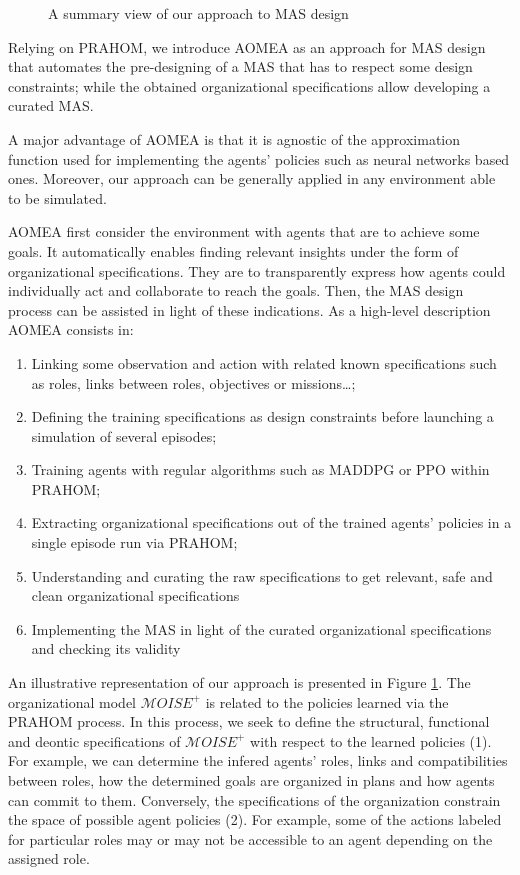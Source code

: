 \documentclass[runningheads]{llncs}
\begin{document}
\begin{figure}[h!]
    \centering
    
    \caption{A summary view of our approach to MAS design}
    \label{fig:design_approach}
\end{figure}

Relying on PRAHOM, we introduce AOMEA as an approach for MAS design that automates the pre-designing of a MAS that has to respect some design constraints; while the obtained organizational specifications allow developing a curated MAS.

A major advantage of AOMEA is that it is agnostic of the approximation function used for implementing the agents' policies such as neural networks based ones. Moreover, our approach can be generally applied in any environment able to be simulated.

AOMEA first consider the environment with agents that are to achieve some goals. It automatically enables finding relevant insights under the form of organizational specifications. They are to transparently express how agents could individually act and collaborate to reach the goals. Then, the MAS design process can be assisted in light of these indications. As a high-level description AOMEA consists in:
\begin{enumerate}
    \item Linking some observation and action with related known specifications such as roles, links between roles, objectives or missions\dots;
    \item Defining the training specifications as design constraints before launching a simulation of several episodes;
    \item Training agents with regular algorithms such as MADDPG or PPO within PRAHOM;
    \item Extracting organizational specifications out of the  trained agents' policies in a single episode run via PRAHOM;
    \item Understanding and curating the raw specifications to get relevant, safe and clean organizational specifications
    \item Implementing the MAS in light of the curated organizational specifications and checking its validity
\end{enumerate}

An illustrative representation of our approach is presented in Figure \ref{fig:design_approach}. The organizational model $\mathcal{M}OISE^{+}$ is related to the policies learned via the PRAHOM process. In this process, we seek to define the structural, functional and deontic specifications of $\mathcal{M}OISE^{+}$ with respect to the learned policies (1). For example, we can determine the infered agents' roles, links and compatibilities between roles, how the determined goals are organized in plans and how agents can commit to them. Conversely, the specifications of the organization constrain the space of possible agent policies (2). For example, some of the actions labeled for particular roles may or may not be accessible to an agent depending on the assigned role.
\end{document}
